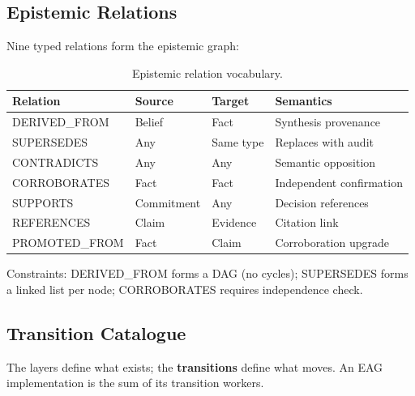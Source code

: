 \documentclass[11pt,a4paper]{article}
\begin{document}
\subsection{Epistemic Relations}

Nine typed relations form the epistemic graph:

\begin{table}[H]
\centering
\caption{Epistemic relation vocabulary.}
\label{tab:relations}
\begin{tabular}{@{}llll@{}}
\toprule
\textbf{Relation} & \textbf{Source} & \textbf{Target} & \textbf{Semantics} \\
\midrule
DERIVED\_FROM & Belief & Fact & Synthesis provenance \\
SUPERSEDES & Any & Same type & Replaces with audit \\
CONTRADICTS & Any & Any & Semantic opposition \\
CORROBORATES & Fact & Fact & Independent confirmation \\
SUPPORTS & Commitment & Any & Decision references \\
REFERENCES & Claim & Evidence & Citation link \\
PROMOTED\_FROM & Fact & Claim & Corroboration upgrade \\
\bottomrule
\end{tabular}
\end{table}

Constraints: DERIVED\_FROM forms a DAG (no cycles); SUPERSEDES forms a linked list per node; CORROBORATES requires independence check.

\subsection{Transition Catalogue}

The layers define what exists; the \textbf{transitions} define what moves. An EAG implementation is the sum of its transition workers.
\end{document}

